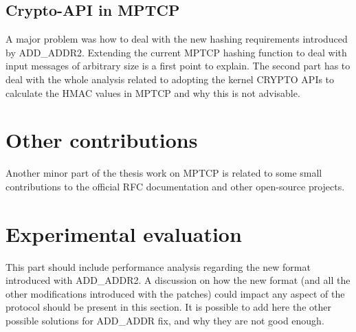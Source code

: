 \subsection{Crypto-API in MPTCP}
A major problem was how to deal with the new hashing requirements introduced by ADD\_ADDR2. Extending the current MPTCP hashing function to deal with input messages of arbitrary size is a first point to explain. The second part has to deal with the whole analysis related to adopting the kernel CRYPTO APIs to calculate the HMAC values in MPTCP and why this is not advisable.

\section{Other contributions}
Another minor part of the thesis work on MPTCP is related to some small contributions to the official RFC documentation and other open-source projects.

\section{Experimental evaluation}
This part should include performance analysis regarding the new format introduced with ADD\_ADDR2. A discussion on how the new format (and all the other modifications introduced with the patches) could impact any aspect of the protocol should be present in this section.
It is possible to add here the other possible solutions for ADD\_ADDR fix, and why they are not good enough. 